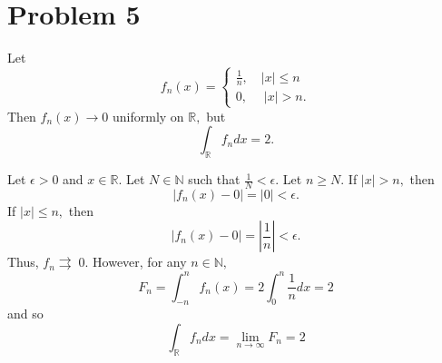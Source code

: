 \documentclass[11pt]{article}
\newcommand{\bbN}{\mathbb{N}}
\newcommand{\bbR}{\mathbb{R}}
\begin{document}
\newpage
\section*{Problem 5}
\begin{problem}
    Let 
    \[f_n(x) = \begin{cases}
        \frac{1}{n}, \quad |x| \leq n\\
        0, \quad \;|x| >n.
    \end{cases}\]
    Then $f_n(x) \to 0$ uniformly on $\bbR,$ but 
    \[\int_\bbR f_n dx = 2.\]
\end{problem}
\begin{solution}
    Let $\epsilon>0$ and $x\in \bbR.$ Let $N \in \bbN$ such that $\frac{1}{N}< \epsilon.$ Let $n \geq N.$ If $|x| > n,$ then 
    \[|f_n(x) - 0| = |0| < \epsilon.\]
    If $|x|\leq n,$ then 
    \[|f_n(x) - 0| = |\frac{1}{n}| < \epsilon.\] Thus, 
    $f_n{\rightrightarrows} \;0.$ However, 
    for any $n \in \bbN,$ 
    \[F_n = \int_{-n}^n f_n(x) = 2\int_0^n \frac{1}{n}dx = 2\] and so 
    \[\int_\bbR f_n dx = \lim_{n\to \infty}F_n = 2\]
\end{solution}



\newpage
\end{document}

